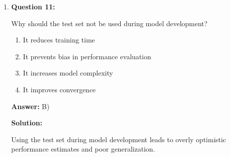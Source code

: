\documentclass{article}
\begin{document}
\begin{enumerate}
\textbf{Solution:}

Low-complexity models (left side) have high bias and cannot capture patterns in the data, leading to underfitting.

\item \textbf{Question 11:}

Why should the test set not be used during model development?

\begin{enumerate}
    \item It reduces training time
    \item It prevents bias in performance evaluation
    \item It increases model complexity
    \item It improves convergence
\end{enumerate}

\textbf{Answer:} B)

\textbf{Solution:}

Using the test set during model development leads to overly optimistic performance estimates and poor generalization.

\end{enumerate}
\end{document}
